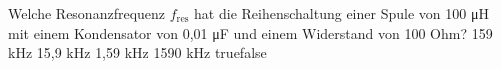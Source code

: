     {Welche Resonanzfrequenz $f_{\textrm{res}}$ hat die Reihenschaltung einer Spule von 100 \si{\micro\henry} mit einem Kondensator von 0,01 \si{\micro\farad} und einem Widerstand von 100 Ohm?}
    {159 kHz}
    {15,9 kHz}
    {1,59 kHz}
    {1590 kHz}
    {true}{false}